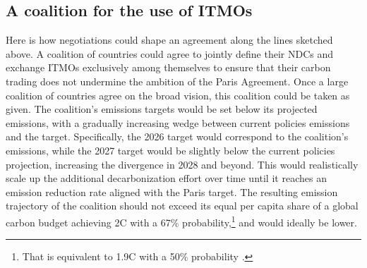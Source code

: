 \documentclass[12pt,english]{article}
\begin{document}


\subsection{A coalition for the use of ITMOs\label{subsec:itmo}}

Here is how negotiations could shape an agreement along the lines sketched above. A coalition of countries could agree to jointly define their NDCs and exchange ITMOs exclusively among themselves to ensure that their carbon trading does not undermine the ambition of the Paris Agreement. 
Once a large coalition of countries agree on the broad vision, this coalition could be taken as given. The coalition's emissions targets would be set below its projected emissions, with a gradually increasing wedge between current policies emissions and the target. Specifically, the 2026 target would correspond to the coalition's emissions, %
while the 2027 target would be slightly below the current policies projection, increasing the divergence in 2028 and beyond. This would realistically scale up the additional decarbonization effort over time 
until it reaches an emission reduction rate aligned with the Paris target. 
The resulting emission trajectory of the coalition should not exceed its equal per capita share of a global carbon budget achieving 2\textdegree{}C with a 67\% probability,\footnote{That is equivalent to 1.9\textdegree{}C with a 50\% probability \citep{forster_indicators_2025}.} and would ideally be lower. %
\end{document}
